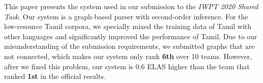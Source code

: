 This paper presents the system used in our submission to the \textit{IWPT 2020 Shared Task}. Our system is a graph-based parser with second-order inference. For the low-resource Tamil corpora, we specially mixed the training data of Tamil with other languages and significantly improved the performance of Tamil. Due to our misunderstanding of the submission requirements, we submitted graphs that are not connected, which makes our system only rank \textbf{6th} over 10 teams. However, after we fixed this problem, our system is 0.6 ELAS higher than the team that ranked \textbf{1st} in the official results.
